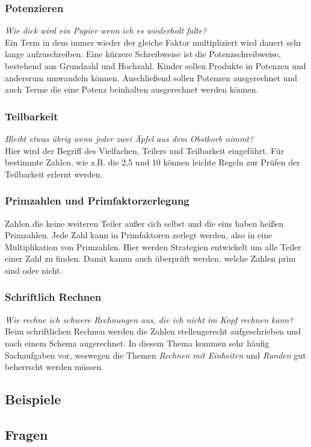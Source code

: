 \documentclass{article}
\begin{document}
\subsubsection*{Potenzieren}
\textit{Wie dick wird ein Papier wenn ich es wiederholt falte?}\\
Ein Term in dem immer wieder der gleiche Faktor multipliziert wird dauert sehr lange aufzuschreiben. Eine kürzere Schreibweise ist die Potenzschreibweise, bestehend aus Grundzahl und Hochzahl. Kinder sollen Produkte in Potenzen und andersrum umwandeln können. Anschließend sollen Potenzen ausgerechnet und auch Terme die eine Potenz beinhalten ausgerechnet werden können.
\subsubsection*{Teilbarkeit}
\textit{Bleibt etwas übrig wenn jeder zwei Äpfel aus dem Obstkorb nimmt?}\\
Hier wird der Begriff des Vielfachen, Teilers und Teilbarkeit eingeführt. Für bestimmte Zahlen, wie z.B. die 2,5 und 10 können leichte Regeln zur Prüfen der Teilbarkeit erlernt werden.
\subsubsection*{Primzahlen und Primfaktorzerlegung}
Zahlen die keine weiteren Teiler außer sich selbst und die eins haben heißen Primzahlen. Jede Zahl kann in Primfaktoren zerlegt werden, also in eine Multiplikation von Primzahlen. Hier werden Strategien entwickelt um alle Teiler einer Zahl zu finden. Damit kannn auch überprüft werden, welche Zahlen prim sind oder nicht.
\subsubsection*{Schriftlich Rechnen}
\textit{Wie rechne ich schwere Rechnungen aus, die ich nicht im Kopf rechnen kann?}\\
Beim schriftlichen Rechnen werden die Zahlen stellengerecht aufgeschrieben und nach einem Schema augerechnet. In diesem Thema kommen sehr häufig Sachaufgaben vor, weswegen die Themen \textit{Rechnen mit Einheiten} und \textit{Runden} gut beherrscht werden müssen.
\subsection{Beispiele}
\subsection{Fragen}
\newpage
\end{document}
